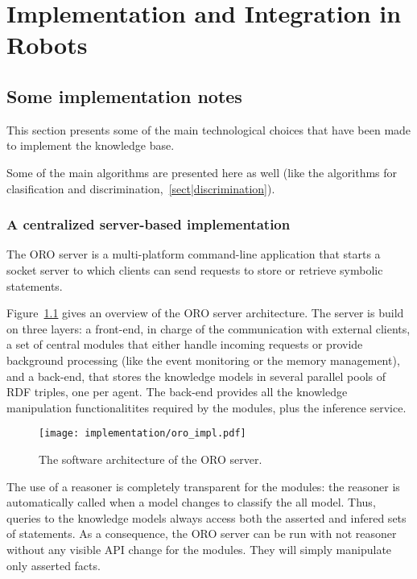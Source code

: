 \chapter{Implementation and Integration in Robots}
\label{chapter|implementation_integration}

\section{Some implementation notes}

This section presents some of the main technological choices that have
been made to implement the knowledge base.

Some of the main algorithms are presented here as well (like the algorithms for
clasification and discrimination,~\ref{sect|discrimination}).

\subsection{A centralized server-based implementation}
\label{sect|oro-server-impl}

The ORO server is a multi-platform command-line application that starts a
socket server to which clients can send requests to store or retrieve symbolic
statements.

Figure~\ref{fig|oro-impl} gives an overview of the ORO server architecture. The
server is build on three layers: a front-end, in charge of the communication
with external clients, a set of central modules that either handle incoming
requests or provide background processing (like the event monitoring or the
memory management), and a back-end, that stores the knowledge models in several
parallel pools of RDF triples, one per agent. The back-end provides all the
knowledge manipulation functionalitites required by the modules, plus the
inference service.

\begin{figure}
    \centering
    \texttt{[image: implementation/oro\_impl.pdf]}
    \caption{The software architecture of the ORO server.}
    \label{fig|oro-impl}
\end{figure}

The use of a reasoner is completely transparent for the modules: the reasoner
is automatically called when a model changes to classify the all model. Thus,
queries to the knowledge models always access both the asserted and infered
sets of statements. As a consequence, the ORO server can be run with not
reasoner without any visible API change for the modules. They will simply
manipulate only asserted facts.

